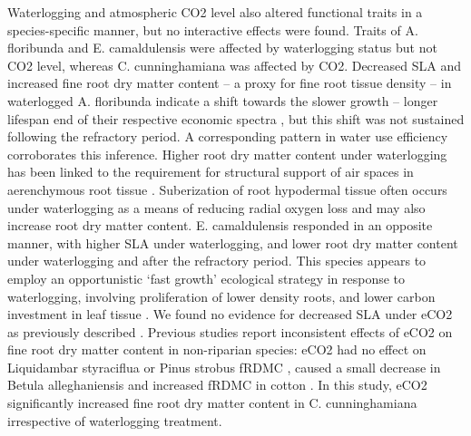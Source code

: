 \documentclass[12pt,a4paper]{memoir}
\begin{document}
Waterlogging and atmospheric CO2 level also altered functional traits in a species-specific manner, but no interactive effects were found. Traits of A. floribunda and E. camaldulensis were affected by waterlogging status but not CO2 level, whereas C. cunninghamiana was affected by CO2. Decreased SLA and increased fine root dry matter content – a proxy for fine root tissue density \citep{Birouste2013} – in waterlogged A. floribunda indicate a shift towards the slower growth – longer lifespan  end of their respective economic spectra \citep{Reich2014}, but this shift was not sustained following the refractory period. A corresponding pattern in water use efficiency corroborates this inference. Higher root dry matter content under waterlogging has been linked to the requirement for structural support of air spaces in aerenchymous root tissue \citep{Ryser2011}. Suberization of root hypodermal tissue often occurs under waterlogging as a means of reducing radial oxygen loss \citep{Visser2000, DeSimone2002} and may also increase root dry matter content. E. camaldulensis responded in an opposite manner, with higher SLA under waterlogging, and lower root dry matter content under waterlogging and after the refractory period. This species appears to employ an opportunistic ‘fast growth’ ecological strategy in response to waterlogging, involving proliferation of lower density roots, and lower carbon investment in leaf tissue \citep{Wright2004, Reich2014}. We found no evidence for decreased SLA under eCO2 as previously described \citep{Poorter2003a}. Previous studies report inconsistent effects of eCO2 on fine root dry matter content in non-riparian species: eCO2 had no effect on Liquidambar styraciflua or Pinus strobus fRDMC \citep{Bauer2001,Iversen2008}, caused a small decrease in Betula alleghaniensis \citep{Bauer2001} and increased fRDMC in cotton \citep{Prior1994}. In this study, eCO2 significantly increased fine root dry matter content in C. cunninghamiana irrespective of waterlogging treatment.
\end{document}
